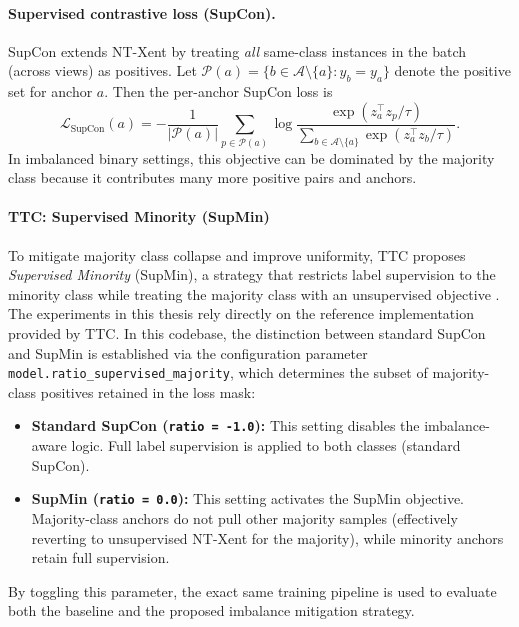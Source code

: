 \paragraph{Supervised contrastive loss (SupCon).}
SupCon extends NT-Xent by treating \emph{all} same-class instances in the batch (across views) as positives.
Let $\mathcal{P}(a)=\{b\in\mathcal{A}\setminus\{a\}: y_b = y_a\}$ denote the positive set for anchor $a$.
Then the per-anchor SupCon loss is
\begin{equation}
  \mathcal{L}_{\text{SupCon}}(a)
  = -\frac{1}{|\mathcal{P}(a)|}\sum_{p\in\mathcal{P}(a)}
  \log \frac{\exp\!\left(z_a^\top z_p/\tau\right)}
  {\sum\limits_{b \in \mathcal{A}\setminus\{a\}} \exp\!\left(z_a^\top z_b/\tau\right)}.
  \label{eq:supcon}
\end{equation}
In imbalanced binary settings, this objective can be dominated by the majority class because it contributes many more positive pairs and anchors.

\paragraph{TTC: Supervised Minority (SupMin)}
To mitigate majority class collapse and improve uniformity, TTC proposes \emph{Supervised Minority} (SupMin), a strategy that restricts label supervision to the minority class while treating the majority class with an unsupervised objective \parencite{ttc_2025}.
The experiments in this thesis rely directly on the reference implementation provided by TTC.
In this codebase, the distinction between standard SupCon and SupMin is established via the configuration parameter \texttt{model.ratio\_supervised\_majority}, which determines the subset of majority-class positives retained in the loss mask:
\begin{itemize}
  \item \textbf{Standard SupCon (\texttt{ratio = -1.0}):} This setting disables the imbalance-aware logic. Full label supervision is applied to both classes (standard SupCon).
  \item \textbf{SupMin (\texttt{ratio = 0.0}):} This setting activates the SupMin objective. Majority-class anchors do not pull other majority samples (effectively reverting to unsupervised NT-Xent for the majority), while minority anchors retain full supervision.
\end{itemize}
By toggling this parameter, the exact same training pipeline is used to evaluate both the baseline and the proposed imbalance mitigation strategy.

